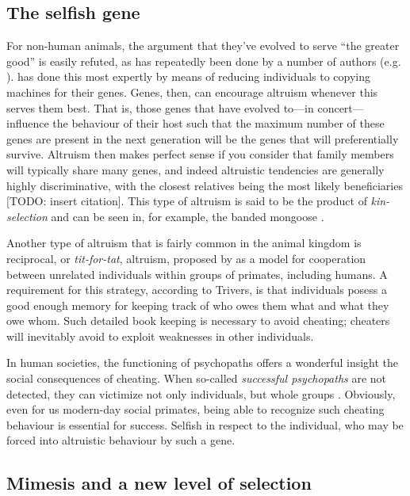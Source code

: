 \documentclass{article}
\begin{document}
\subsection{The selfish gene}
\label{sec:genes}

For non-human animals, the argument that they've evolved to serve “the greater
good” is easily refuted, as has repeatedly been done by a number of authors
(e.g. \citealp{dawkins1976,}). \citet{dawkins1976} has done this most expertly by
means of reducing individuals to copying machines for their genes. Genes, then,
can encourage altruism whenever this serves them best. That is, those genes
that have evolved to---in concert---influence the behaviour of their host such
that the maximum number of these genes are present in the next generation will
be the genes that will preferentially survive. Altruism then makes perfect
sense if you consider that family members will typically share many genes, and
indeed altruistic tendencies are generally highly discriminative, with the
closest relatives being the most likely beneficiaries [TODO: insert citation]. This
type of altruism is said to be the product of \emph{kin-selection} and can
be seen in, for example, the banded mongoose \citep{gilchrist2004a,
gilchrist2004b, hodge2005}.

Another type of altruism that is fairly common in the animal kingdom is
reciprocal, or \emph{tit-for-tat}, altruism, proposed by \citet{trivers1971}
as a model for cooperation between unrelated individuals within groups
of primates, including humans. A requirement for this strategy, according to
Trivers, is that individuals posess a good enough memory for keeping track of who
owes them what and what they owe whom. Such detailed book keeping is necessary
to avoid cheating; cheaters will inevitably avoid to exploit weaknesses in
other individuals.

In human societies, the functioning of psychopaths offers a wonderful insight
the social consequences of cheating. When so-called \emph{successful
psychopaths} are not detected, they can victimize not only individuals, but
whole groups \citep{babiak1995, boddy2006, boddy2010, kirkman2005}. Obviously, even for us modern-day social primates, being able to
recognize such cheating behaviour is essential for success.
Selfish in respect to the individual, who may be forced into altruistic behaviour by such a gene.


\subsection{Mimesis and a new level of selection}
\end{document}
